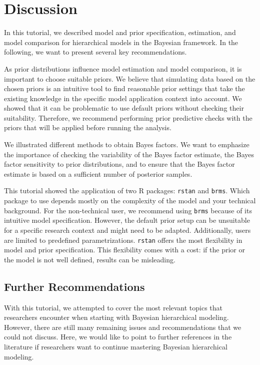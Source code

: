 \documentclass[
  english,
  doc,floatsintext]{apa6}
\begin{document}
\hypertarget{discussion}{%
\section{Discussion}\label{discussion}}

In this tutorial, we described model and prior specification, estimation, and model comparison for hierarchical models in the Bayesian framework. In the following, we want to present several key recommendations.

As prior distributions influence model estimation and model comparison, it is important to choose suitable priors. We believe that simulating data based on the chosen priors is an intuitive tool to find reasonable prior settings that take the existing knowledge in the specific model application context into account. We showed that it can be problematic to use default priors without checking their suitability. Therefore, we recommend performing prior predictive checks with the priors that will be applied before running the analysis.

We illustrated different methods to obtain Bayes factors. We want to emphasize the importance of checking the variability of the Bayes factor estimate, the Bayes factor sensitivity to prior distributions, and to ensure that the Bayes factor estimate is based on a sufficient number of posterior samples.

This tutorial showed the application of two R packages: \texttt{rstan} and \texttt{brms}. Which package to use depends mostly on the complexity of the model and your technical background. For the non-technical user, we recommend using \texttt{brms} because of its intuitive model specification. However, the default prior setup can be unsuitable for a specific research context and might need to be adapted. Additionally, users are limited to predefined parametrizations. \texttt{rstan} offers the most flexibility in model and prior specification. This flexibility comes with a cost: if the prior or the model is not well defined, results can be misleading.

\hypertarget{further-recommendations}{%
\subsection{Further Recommendations}\label{further-recommendations}}

With this tutorial, we attempted to cover the most relevant topics that researchers encounter when starting with Bayesian hierarchical modeling. However, there are still many remaining issues and recommendations that we could not discuss. Here, we would like to point to further references in the literature if researchers want to continue mastering Bayesian hierarchical modeling.
\end{document}
